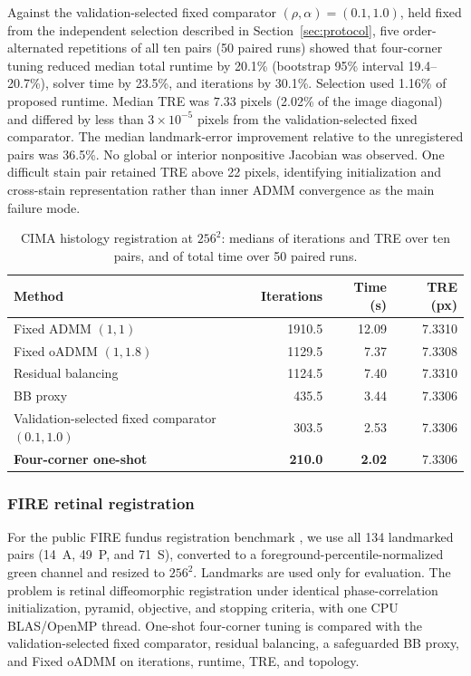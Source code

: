 \documentclass[pdflatex,iicol,sn-mathphys-num]{sn-jnl}
\theoremstyle{definition}
\begin{document}
Against the validation-selected fixed comparator $(\rho,\alpha)=(0.1,1.0)$,
held fixed from the independent selection described in
Section~\ref{sec:protocol}, five order-alternated repetitions of all ten pairs
(50 paired runs) showed that four-corner tuning reduced
median total runtime by 20.1\% (bootstrap 95\% interval 19.4--20.7\%), solver
time by 23.5\%, and iterations by 30.1\%. Selection used 1.16\% of proposed
runtime. Median TRE was $7.33$ pixels (2.02\% of the image diagonal) and
differed by less than $3\times10^{-5}$ pixels from the validation-selected
fixed comparator. The
median landmark-error improvement relative to the unregistered pairs was
36.5\%. No global or interior nonpositive Jacobian was observed. One difficult
stain pair retained TRE above 22 pixels, identifying initialization and
cross-stain representation rather than inner ADMM convergence as the main
failure mode.

\begin{table}[t]
\centering
\footnotesize
\caption{CIMA histology registration at $256^2$: medians of iterations and TRE
over ten pairs, and of total time over 50 paired runs.}
\label{tab:cima}
\begin{tabular}{lrrr}
\toprule
Method & Iterations & Time (s) & TRE (px)\\
\midrule
Fixed ADMM $(1, 1)$ & 1910.5 & 12.09 & 7.3310\\
Fixed oADMM $(1, 1.8)$ & 1129.5 & 7.37 & 7.3308\\
Residual balancing & 1124.5 & 7.40 & 7.3310\\
BB proxy & 435.5 & 3.44 & 7.3306\\
Validation-selected fixed comparator $(0.1, 1.0)$ & 303.5 & 2.53 & 7.3306\\
\textbf{Four-corner one-shot} & \textbf{210.0} & \textbf{2.02} & 7.3306\\
\bottomrule
\end{tabular}
\end{table}

\subsubsection{FIRE retinal registration}
For the public FIRE fundus registration benchmark
\cite{HernandezMatas2017}, we use all 134 landmarked pairs (14~A, 49~P, and
71~S), converted to a foreground-percentile-normalized green channel and
resized to $256^2$. Landmarks are used only for evaluation. The problem is
retinal diffeomorphic registration under identical phase-correlation
initialization, pyramid, objective, and stopping criteria, with one CPU
BLAS/OpenMP thread.
One-shot four-corner tuning is compared with the validation-selected fixed
comparator, residual balancing, a safeguarded BB proxy, and Fixed oADMM on
iterations, runtime, TRE, and topology.
\end{document}

